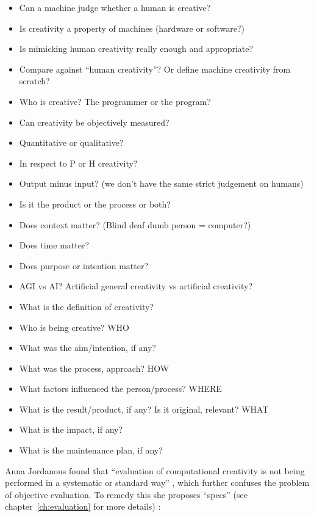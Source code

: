 \begin{itemize}
  \item Can a machine judge whether a human is creative?
  \item Is creativity a property of machines (hardware or software?)
  \item Is mimicking human creativity really enough and appropriate?
  \item Compare against ``human creativity''? Or define machine creativity from scratch?
  \item Who is creative? The programmer or the program?
  \item Can creativity be objectively measured?
  \item Quantitative or qualitative?
  \item In respect to P or H creativity?
  \item Output minus input? (we don’t have the same strict judgement on humans)
  \item Is it the product or the process or both?
  \item Does context matter? (Blind deaf dumb person = computer?)
  \item Does time matter?
  \item Does purpose or intention matter?
  \item AGI vs AI? Artificial general creativity vs artificial creativity?
  \item What is the definition of creativity?
  \item Who is being creative? WHO
  \item What was the aim/intention, if any?
  \item What was the process, approach? HOW
  \item What factors influenced the person/process? WHERE
  \item What is the result/product, if any? Is it original, relevant? WHAT
  \item What is the impact, if any?
  \item What is the maintenance plan, if any?
\end{itemize}


\spirals

Anna Jordanous found that ``evaluation of computational creativity is not being performed in a systematic or standard way'' \autocite[p.2]{Jordanous2011}, which further confuses the problem of objective evaluation. To remedy this she proposes ``\gls{specs}'' (see chapter~\ref{ch:evaluation} for more details) \autocite[p.137-140]{Jordanous2012a}:

